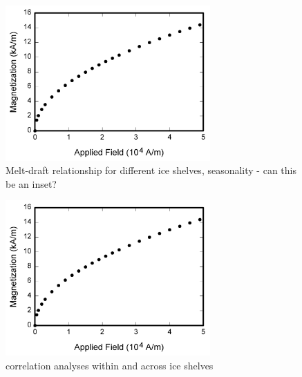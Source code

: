 \begin{figure}
\centerline{\includegraphics[width=18.5pc]{fig/fig1.png}}
\caption{Melt-draft relationship for different ice shelves, seasonality - can this be an inset?}
\end{figure}

\begin{figure}
\centerline{\includegraphics[width=18.5pc]{fig/fig1.png}}
\caption{correlation analyses within and across ice shelves}
\end{figure}

